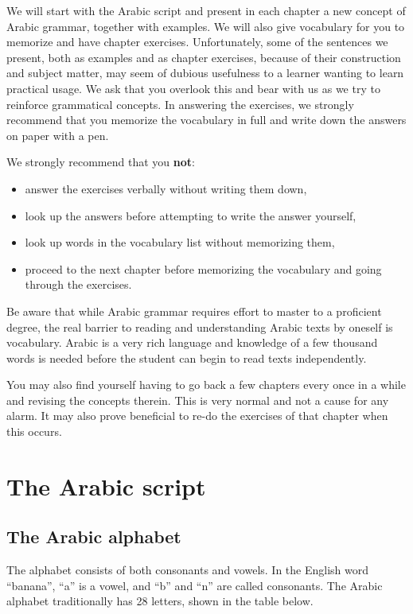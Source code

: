 \documentclass[
  10pt,
]{book}
\providecommand{\tightlist}{%
  \setlength{\itemsep}{0pt}\setlength{\parskip}{0pt}}
\begin{document}
We will start with the Arabic script and present in each chapter a new concept of Arabic grammar, together with examples. We will also give vocabulary for you to memorize and have chapter exercises. Unfortunately, some of the sentences we present, both as examples and as chapter exercises, because of their construction and subject matter, may seem of dubious usefulness to a learner wanting to learn practical usage. We ask that you overlook this and bear with us as we try to reinforce grammatical concepts. In answering the exercises, we strongly recommend that you memorize the vocabulary in full and write down the answers on paper with a pen.

We strongly recommend that you \textbf{not}:

\begin{itemize}
\tightlist
\item
  answer the exercises verbally without writing them down,
\item
  look up the answers before attempting to write the answer yourself,
\item
  look up words in the vocabulary list without memorizing them,
\item
  proceed to the next chapter before memorizing the vocabulary and going through the exercises.
\end{itemize}

Be aware that while Arabic grammar requires effort to master to a proficient degree, the real barrier to reading and understanding Arabic texts by oneself is vocabulary. Arabic is a very rich language and knowledge of a few thousand words is needed before the student can begin to read texts independently.

You may also find yourself having to go back a few chapters every once in a while and revising the concepts therein. This is very normal and not a cause for any alarm. It may also prove beneficial to re-do the exercises of that chapter when this occurs.

\chapter{The Arabic script}\label{the-arabic-script}

\section{The Arabic alphabet}\label{the-arabic-alphabet}

The alphabet consists of both consonants and vowels. In the English word \enquote{banana}, \enquote{a} is a vowel, and \enquote{b} and \enquote{n} are called consonants.
The Arabic alphabet traditionally has 28 letters, shown in the table below.
\end{document}

